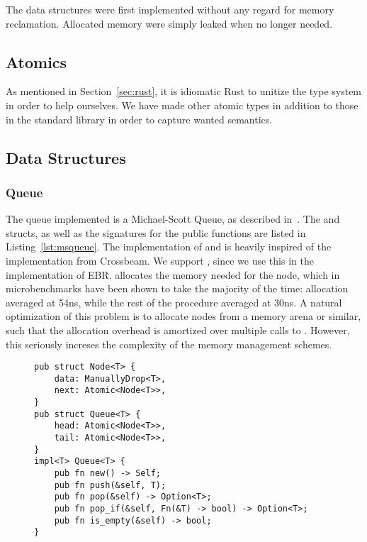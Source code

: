 \documentclass[b5paper]{report}
\begin{document}
The data structures were first implemented without any regard for memory
reclamation. Allocated memory were simply leaked when no longer needed.

\subsection{Atomics}


As mentioned in Section~\ref{sec:rust}, it is idiomatic Rust to unitize the type
system in order to help ourselves. We have made other atomic types in addition
to those in the standard library in order to capture wanted semantics.

\subsection{Data Structures}

\subsubsection{Queue}


The queue implemented is a Michael-Scott Queue, as described
in~\cite{michael1996simple}. The  and  structs, as well
as the signatures for the public functions are listed in
Listing~\ref{lst:msqueue}. The implementation of  and  is
heavily inspired of the implementation from Crossbeam\cite{crossbeam-msqueue}.
We support , since we use this in the implementation of EBR.
 allocates the memory needed for the node, which in microbenchmarks
have been shown to take the majority of the time: allocation averaged at 54ns,
while the rest of the procedure averaged at 30ns.  A natural optimization of
this problem is to allocate nodes from a memory arena or similar, such that the
allocation overhead is amortized over multiple calls to . However,
this seriously increses the complexity of the memory management schemes.

\begin{figure}[ht]
\begin{lstlisting}[caption=Structs for the Michael-Scott
Queue,label=lst:msqueue,numbers=none]
pub struct Node<T> {
    data: ManuallyDrop<T>,
    next: Atomic<Node<T>>,
}
pub struct Queue<T> {
    head: Atomic<Node<T>>,
    tail: Atomic<Node<T>>,
}
impl<T> Queue<T> {
    pub fn new() -> Self;
    pub fn push(&self, T);
    pub fn pop(&self) -> Option<T>;
    pub fn pop_if(&self, Fn(&T) -> bool) -> Option<T>;
    pub fn is_empty(&self) -> bool;
}
\end{lstlisting}
\end{figure}
\end{document}
